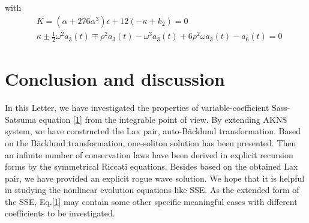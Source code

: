 \documentclass[12pt]{article}
\begin{document}
with
\begin{align}
  & K = (\alpha+276\alpha^{3})\epsilon+12(-\kappa+k_{2}) = 0 \\
  & \kappa \pm \frac{1}{2}\omega^{2}a_{3}(t) \mp \rho^{2}a_{3}(t) - \omega^{3}a_{3}(t) + 6\rho^{2}\omega a_{3}(t) - a_{6}(t) = 0
\end{align}


\section{Conclusion and discussion}
In this Letter, we have investigated the properties of variable-coefficient Sass-Satsuma equation \eqref{1} from the integrable point of view. By extending AKNS system, we have constructed the Lax pair, auto-B\"acklund transformation. Based on the B\"acklund transformation, one-soliton solution has been presented. Then an infinite number of conservation laws have been derived in explicit recursion forms by the symmetrical Riccati equations. Besides based on the obtained Lax pair, we have provided an explicit rogue wave solution. We hope that it is helpful in studying the nonlinear evolution equations like SSE. As the extended form of the SSE, Eq.\eqref{1} may contain some other specific meaningful cases with different coefficients to be investigated.

\small


\end{document}
